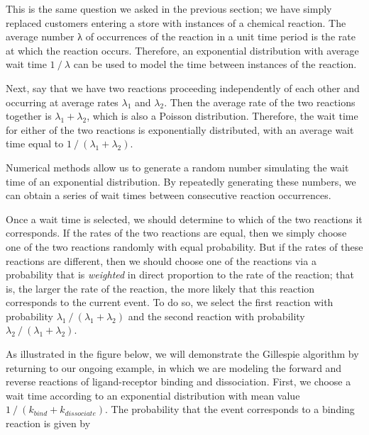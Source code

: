This is the same question we asked in the previous section; we have simply replaced customers entering a store with instances of a chemical reaction. The average number λ of occurrences of the reaction in a unit time period is the rate at which the reaction occurs. Therefore, an exponential distribution with average wait time $1\mathbin{/}\lambda$ can be used to model the time between instances of the reaction.

Next, say that we have two reactions proceeding independently of each other and occurring at average rates $\lambda_1$ and $\lambda_2$. Then the average rate of the two reactions together is $\lambda_1 + \lambda_2$, which is also a Poisson distribution. Therefore, the wait time for either of the two reactions is exponentially distributed, with an average wait time equal to $1\mathbin{/}(\lambda_1 + \lambda_2)$.

Numerical methods allow us to generate a random number simulating the wait time of an exponential distribution. By repeatedly generating these numbers, we can obtain a series of wait times between consecutive reaction occurrences.

Once a wait time is selected, we should determine to which of the two reactions it corresponds. If the rates of the two reactions are equal, then we simply choose one of the two reactions randomly with equal probability. But if the rates of these reactions are different, then we should choose one of the reactions via a probability that is \textit{weighted} in direct proportion to the rate of the reaction; that is, the larger the rate of the reaction, the more likely that this reaction corresponds to the current event. To do so, we select the first reaction with probability $\lambda_1\mathbin{/}(\lambda_1 + \lambda_2)$ and the second reaction with probability $\lambda_2\mathbin{/}(\lambda_1 + \lambda_2)$.\\

\begin{qbox}\end{qbox}

As illustrated in the figure below, we will demonstrate the Gillespie algorithm by returning to our ongoing example, in which we are modeling the forward and reverse reactions of ligand-receptor binding and dissociation. First, we choose a wait time according to an exponential distribution with mean value $1\mathbin{/}(k_{bind} + k_{dissociate})$. The probability that the event corresponds to a binding reaction is given by

